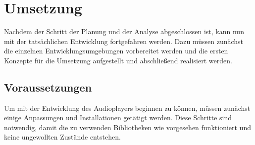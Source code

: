 
\chapter{Umsetzung}

Nachdem der Schritt der Planung und der Analyse abgeschlossen ist, kann nun mit
der tatsächlichen Entwicklung fortgefahren werden. Dazu müssen zunächst die einzelnen
Entwicklungsumgebungen vorbereitet werden und die ersten Konzepte für
die Umsetzung aufgestellt und abschließend realisiert werden.

\section{Voraussetzungen}
Um mit der Entwicklung des Audioplayers beginnen zu können, müssen zunächst
einige Anpassungen und Installationen getätigt werden. Diese Schritte sind
notwendig, damit die zu verwenden Bibliotheken wie vorgesehen funktioniert und
keine ungewollten Zustände entstehen.


